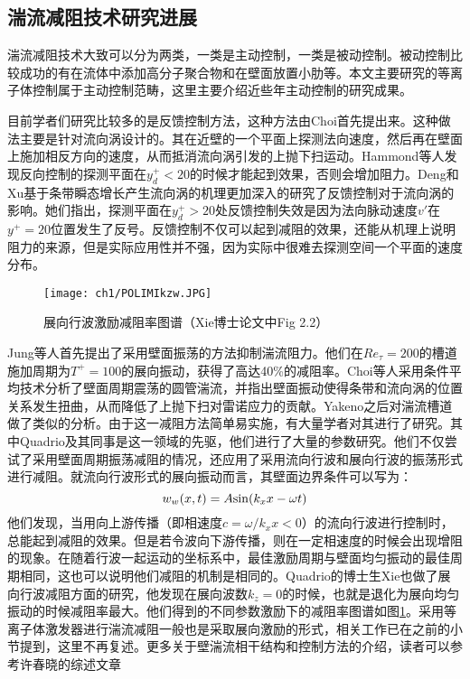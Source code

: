 \subsection{湍流减阻技术研究进展}
\label{chap1:sample:table}
湍流减阻技术大致可以分为两类，一类是主动控制，一类是被动控制。被动控制比较成功的有在流体中添加高分子聚合物\cite{White2008Mechanics}和在壁面放置小肋\cite{Garcia2011}等。本文主要研究的等离子体控制属于主动控制范畴，这里主要介绍近些年主动控制的研究成果。

目前学者们研究比较多的是反馈控制方法，这种方法由Choi\cite{Choi1994}首先提出来。这种做法主要是针对流向涡设计的。其在近壁的一个平面上探测法向速度，然后再在壁面上施加相反方向的速度，从而抵消流向涡引发的上抛下扫运动。Hammond等人\cite{Hammond1998}发现反向控制的探测平面在$y^+_d<20$的时候才能起到效果，否则会增加阻力。Deng和Xu\cite{Deng2012}基于条带瞬态增长产生流向涡的机理更加深入的研究了反馈控制对于流向涡的影响。她们指出，探测平面在$y^+_d>20$处反馈控制失效是因为法向脉动速度$v'$在$y^+=20$位置发生了反号。反馈控制不仅可以起到减阻的效果，还能从机理上说明阻力的来源，但是实际应用性并不强，因为实际中很难去探测空间一个平面的速度分布。

\begin{figure}[htb]
  \centering
  \texttt{[image: ch1/POLIMIkzw.JPG]}
  \caption{展向行波激励减阻率图谱（Xie博士论文\cite{Xie2014}中Fig 2.2）}\label{f:POLIMIkzw}
\end{figure}
Jung等人\cite{Jung1992}首先提出了采用壁面振荡的方法抑制湍流阻力。他们在$Re_\tau=200$的槽道施加周期为$T^+=100$的展向振动，获得了高达40\%的减阻率。Choi等人\cite{Choi2002}采用条件平均技术分析了壁面周期震荡的圆管湍流，并指出壁面振动使得条带和流向涡的位置关系发生扭曲，从而降低了上抛下扫对雷诺应力的贡献。Yakeno\cite{Yakeno2014}之后对湍流槽道做了类似的分析。由于这一减阻方法简单易实施，有大量学者对其进行了研究。其中Quadrio及其同事是这一领域的先驱，他们进行了大量的参数研究\cite{Quadrio2009,Quadrio2011,Gatti2013,Gatti2016}。他们不仅尝试了采用壁面周期振荡减阻的情况，还应用了采用流向行波和展向行波的振荡形式进行减阻。就流向行波形式的展向振动而言，其壁面边界条件可以写为：
\begin{equation}
   w_w(x,t)=A{\rm sin}(k_xx-\omega t)
\end{equation}
他们发现，当用向上游传播（即相速度$c=\omega/k_xx<0$）的流向行波进行控制时，总能起到减阻的效果。但是若令波向下游传播，则在一定相速度的时候会出现增阻的现象。在随着行波一起运动的坐标系中，最佳激励周期与壁面均匀振动的最佳周期相同，这也可以说明他们减阻的机制是相同的。Quadrio的博士生Xie也做了展向行波减阻方面的研究\cite{Xie2014}，他发现在展向波数$k_z=0$的时候，也就是退化为展向均匀振动的时候减阻率最大。他们得到的不同参数激励下的减阻率图谱如图\ref{f:POLIMIkzw}。采用等离子体激发器进行湍流减阻一般也是采取展向激励的形式，相关工作已在之前的小节提到，这里不再复述。更多关于壁湍流相干结构和控制方法的介绍，读者可以参考许春晓的综述文章\cite{Xu2015bi}




